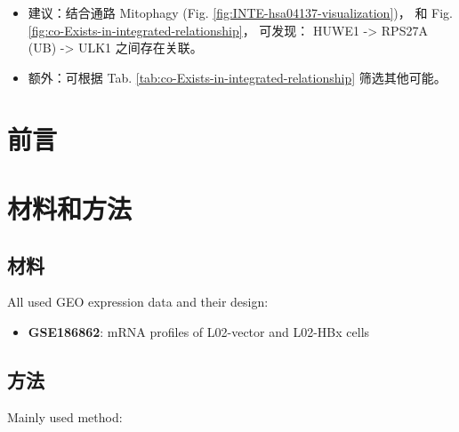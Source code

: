 \documentclass[
]{article}
\providecommand{\tightlist}{%
  \setlength{\itemsep}{0pt}\setlength{\parskip}{0pt}}
\begin{document}
\begin{itemize}
  \begin{itemize}
  \tightlist
  \item
    建议：结合通路 Mitophagy (Fig. \ref{fig:INTE-hsa04137-visualization})，
    和 Fig. \ref{fig:co-Exists-in-integrated-relationship}，
    可发现： HUWE1 -\textgreater{} RPS27A (UB) -\textgreater{} ULK1 之间存在关联。
  \item
    额外：可根据 Tab. \ref{tab:co-Exists-in-integrated-relationship} 筛选其他可能。
  \end{itemize}
\end{itemize}

\hypertarget{introduction}{%
\section{前言}\label{introduction}}

\hypertarget{methods}{%
\section{材料和方法}\label{methods}}

\hypertarget{ux6750ux6599}{%
\subsection{材料}\label{ux6750ux6599}}

All used GEO expression data and their design:

\begin{itemize}
\tightlist
\item
  \textbf{GSE186862}: mRNA profiles of L02-vector and L02-HBx cells
\end{itemize}

\hypertarget{ux65b9ux6cd5}{%
\subsection{方法}\label{ux65b9ux6cd5}}

Mainly used method:
\end{document}

